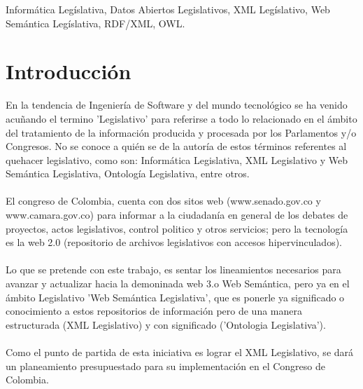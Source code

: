 \documentclass[conference]{IEEEtran}
\begin{document}
\begin{IEEEkeywords}
Informática Legíslativa, Datos Abiertos Legislativos, XML Legíslativo, Web Semántica Legíslativa, RDF/XML, OWL.
\end{IEEEkeywords}


\section{Introducción}
	En la tendencia de Ingeniería de Software y del mundo tecnológico se ha venido acuñando el termino 'Legislativo' para referirse a todo lo relacionado en el ámbito del tratamiento de la información producida y procesada por los Parlamentos y/o Congresos. No se conoce a quién se de la autoría de estos términos referentes al quehacer legislativo, como son: Informática Legislativa, XML Legislativo y Web Semántica Legislativa, Ontología Legislativa, entre otros.\\\\
	El congreso de Colombia, cuenta con dos sitos web (www.senado.gov.co y www.camara.gov.co) para informar a la ciudadanía en general de los debates de proyectos, actos legislativos, control politico y otros servicios; pero la tecnología es la web 2.0 (repositorio de archivos legislativos con accesos hipervinculados). \\ \\
	Lo que se pretende con este trabajo, es sentar los lineamientos necesarios para avanzar y actualizar hacia la demoninada web 3.o Web Semántica, pero ya en el ámbito Legislativo 'Web Semántica Legislativa', que es ponerle ya significado o conocimiento a estos repositorios de información pero de una manera estructurada (XML Legislativo) y con significado ('Ontologia Legislativa'). \\ \\ 
	Como el punto de partida de esta iniciativa es lograr el XML Legislativo, se dará un planeamiento presupuestado para su implementación en el Congreso de Colombia.

\end{document}
